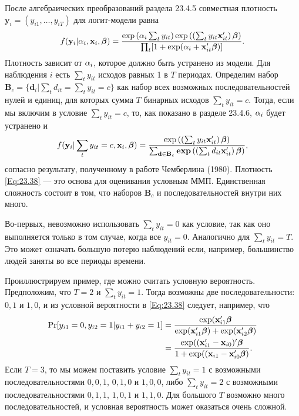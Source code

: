 После алгебраических преобразований раздела 23.4.5 совместная плотность $\mathbf{y}_i=(y_{i1}, \dots, y_{iT})$ для логит-модели равна
\begin{align}
f(\mathbf{y}_i|\alpha_i, \mathbf{x}_i, \bm{\beta}) = \frac{\exp  \left(\alpha_i \sum_t y_{it} \right) \exp  \left( \left( \sum_t y_{it} \mathbf{x}'_{it} \right) \bm{\beta} \right)}{\prod_t [1+ \exp (\alpha_i+\mathbf{x}'_{it} \bm{\beta}) ]}.
\label{Eq:23.37}
\end{align}
Плотность зависит от $\alpha_i$, которое должно быть устранено из модели. Для наблюдения $i$ есть $\sum_t y_{it}$ исходов равных 1 в $T$ периодах. Определим набор $\mathbf{B}_c=\{\mathbf{d}_i|\sum_t d_{it}=\sum_t y_{it}=c\}$ как набор всех возможных последовательностей нулей и единиц, для которых сумма $T$ бинарных исходов $\sum_t y_{it}=c$. Тогда, если мы включим в условие $\sum_t y_{it}=c$, то, как показано в разделе 23.4.6,  $\alpha_i$ будет устранено и 
\begin{align}
f(\mathbf{y}_i|\sum_t y_{it} = c, \mathbf{x}_i, \bm{\beta}) = \frac{\exp \left(\left(\sum_t y_{it} \mathbf{x}'_{it} \right) \bm{\beta} \right)}{\sum_{\mathbf{d} \in \mathbf{B}_c} \mathbf{exp} \left( \left( \sum_t d_{it} \mathbf{x}'_{it} \right) \bm{\beta} \right)},
\label{Eq:23.38}
\end{align}
согласно результату, полученному в работе Чемберлина (1980). Плотность \ref{Eq:23.38} --- это основа для оценивания условным ММП. Единственная сложность состоит в том, что наборов $\mathbf{B}_c$ и последовательностей внутри них много.

Во-первых, невозможно использовать $\sum_t y_{it}=0$ как условие, так как оно выполняется только в том случае, когда все $y_{it}=0$. Аналогично для  $\sum_t y_{it}=T$. Это может означать большую потерю наблюдений если, например, большинство людей заняты во все периоды времени.

Проиллюстрируем пример, где можно считать условную вероятность. Предположим, что $T=2$ и $\sum_t y_{it}=1$. Тогда возможны две последовательности: ${0, 1}$ и ${1, 0}$, и из условной вероятности в \ref{Eq:23.38} следует, например, что
\begin{align}
\mathrm{Pr} [y_{i1}=0, y_{i2}=1 | y_{i1}+ y_{i2}=1]
&=\frac{\exp (\mathbf{x}'_{i1}\bm{\beta}}{\exp (\mathbf{x}'_{i1}\bm{\beta})+\exp (\mathbf{x}'_{i2}\bm{\beta})} \nonumber \\
& = \frac{\exp ((\mathbf{x}'_{i1}-\mathbf{x}_{i0})'\bm{\beta}}{1+\exp ((\mathbf{x}_{i1}-\mathbf{x}_{i0}'\bm{\beta})}.
\nonumber
\end{align} 
Если $T=3$, то мы можем поставить условие $\sum_t y_{it}=1$ с возможными последовательностями ${0, 0, 1}$, ${0, 1, 0}$ и ${1, 0, 0}$, либо $\sum_t y_{it}=2$ с возможными последовательностями ${0, 1, 1}$, ${1, 0, 1}$ и ${1, 1, 0}$. Для большого $T$ возможно много последовательностей, и условная вероятность может оказаться очень сложной.

